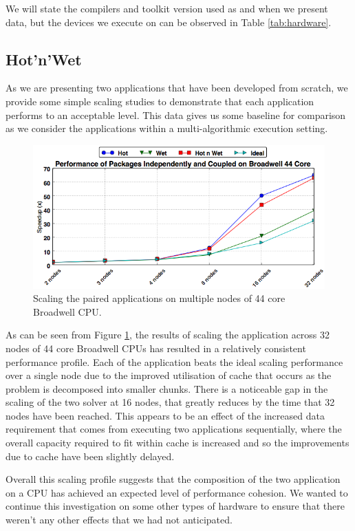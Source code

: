 \documentclass[runningheads,a4paper]{llncs}
\begin{document}
We will state the compilers and toolkit version used as and when we present data, but the devices we execute on can be observed in Table \ref{tab:hardware}.

\subsection{Hot'n'Wet}

As we are presenting two applications that have been developed from scratch, we provide some simple scaling studies to demonstrate that each application performs to an acceptable level. This data gives us some baseline for comparison as we consider the applications within a multi-algorithmic execution setting.

\begin{figure}
  \centering
  \includegraphics[width=1.0\linewidth]{cpu_results}
  \caption{Scaling the paired applications on multiple nodes of 44 core Broadwell CPU.}
  \label{fig:scaling-hot-wet-broadwell}
\end{figure}

As can be seen from Figure \ref{fig:scaling-hot-wet-broadwell}, the results of scaling the application across 32 nodes of 44 core Broadwell CPUs has resulted in a relatively consistent performance profile. Each of the application beats the ideal scaling performance over a single node due to the improved utilisation of cache that occurs as the problem is decomposed into smaller chunks. There is a noticeable gap in the scaling of the two solver at 16 nodes, that greatly reduces by the time that 32 nodes have been reached. This appears to be an effect of the increased data requirement that comes from executing two applications sequentially, where the overall capacity required to fit within cache is increased and so the improvements due to cache have been slightly delayed.

Overall this scaling profile suggests that the composition of the two application on a CPU has achieved an expected level of performance cohesion. We wanted to continue this investigation on some other types of hardware to ensure that there weren't any other effects that we had not anticipated.
\end{document}
